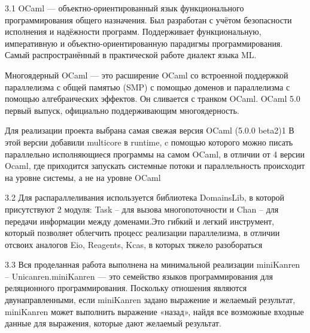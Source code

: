 3.1 OCaml — объектно-ориентированный язык
функционального программирования общего назначения.
Был разработан с учётом безопасности исполнения и надёжности 
программ. Поддерживает функциональную, императивную
и объектно-ориентированную парадигмы программирования. 
Самый распространённый в практической работе диалект языка ML. 

Многоядерный OCaml — это расширение OCaml со
встроенной поддержкой параллелизма с
общей памятью (SMP) с помощью доменов и
параллелизма с помощью алгебраических эффектов. 
Он сливается с транком OCaml. OCaml 5.0 первый 
выпуск, официально поддерживающим многоядерность.

Для реализации проекта выбрана самая свежая версия OCaml (5.0.0 beta2)1
В этой версии добавили multicore в runtime, c помощью которого можно
писать параллельно исполняющиеся программы на самом OCaml, в отличии от 4 версии
Ocaml, где приходится запускать системные потоки и параллельность происходит на уровне системы, 
а не на уровне OCaml

3.2 Для распараллеливания используется библиотека DomainsLib, в
которой присутствуют 2 модуля: Task – для вызова
многопоточности и Chan – для передачи информации между
доменами.Это гибкий и легкий инструмент, который позволяет 
облегчить процесс реализации параллелизма, в отличии отсвоих 
аналогов Eio, Reagents, Kcas, в которых тяжело разобораться

3.3 Вся проделанная работа выполнена на минимальной реализации
miniKanren – Unicanren.miniKanren — это семейство 
языков программирования для реляционного программирования. 
Поскольку отношения являются двунаправленными, если miniKanren 
задано выражение и желаемый результат, miniKanren может выполнить 
выражение «назад», найдя все возможные входные данные для 
выражения, которые дают желаемый результат.
